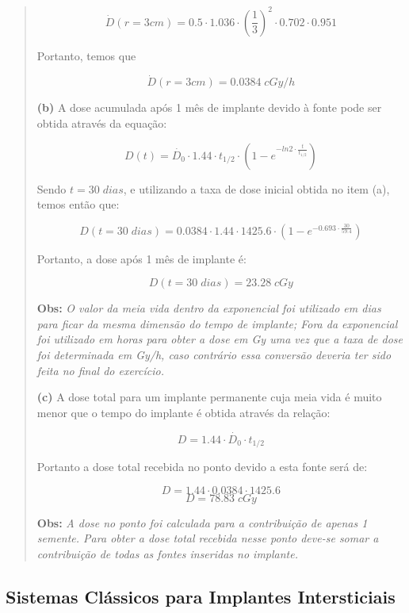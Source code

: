 \documentclass[11pt,a4paper]{article}
\begin{document}
\begin{quote}
					$$\dot{D}(r= 3cm) = 0.5 \cdot 1.036 \cdot \left(\frac{1}{3}\right)^2 \cdot 0.702 \cdot 0.951$$

					Portanto, temos que

					$$\dot{D}(r= 3cm) = 0.0384 \; cGy / h$$

				\textbf{(b)} A dose acumulada após 1 mês de implante devido à fonte pode ser obtida através da equação:

					$$D(t) = \dot{D_0} \cdot 1.44 \cdot t_{1/2} \cdot \left(1 - e^{- ln 2 \cdot \frac{t}{t_{1/2}}}\right)$$

					Sendo $t = 30 \; dias$, e utilizando a taxa de dose inicial obtida no item (a), temos então que:

					$$D(t = 30 \; dias) = 0.0384 \cdot 1.44 \cdot 1425.6 \cdot \left(1 - e^{- 0.693 \cdot \frac{30}{59.4}}\right) $$

					Portanto, a dose após 1 mês de implante é:

					$$D(t = 30 \; dias) = 23.28 \; cGy$$

					\textbf{\textcolor{CarnationPink}{Obs:}} \textit{O valor da meia vida dentro da exponencial foi utilizado em dias para ficar da mesma dimensão do tempo de implante; Fora da exponencial foi utilizado em horas para obter a dose em Gy uma vez que a taxa de dose foi determinada em Gy/h, caso contrário essa conversão deveria ter sido feita no final do exercício.}

				\textbf{(c)} A dose total para um implante permanente cuja meia vida é muito menor que o tempo do implante é obtida através da relação:

					$$D = 1.44 \cdot \dot{D_0} \cdot t_{1/2}$$

					Portanto a dose total recebida no ponto devido a esta fonte será de:

					$$D = 1.44 \cdot 0.0384 \cdot 1425.6$$
					$$D = 78.83 \; cGy$$

				\textbf{\textcolor{CarnationPink}{Obs:}} \textit{ A dose no ponto foi calculada para a contribuição de apenas 1 semente. Para obter a dose total recebida nesse ponto deve-se somar a contribuição de todas as fontes inseridas no implante.}



			\end{quote}

		
		\subsection{Sistemas Clássicos para Implantes Intersticiais}
\end{document}
